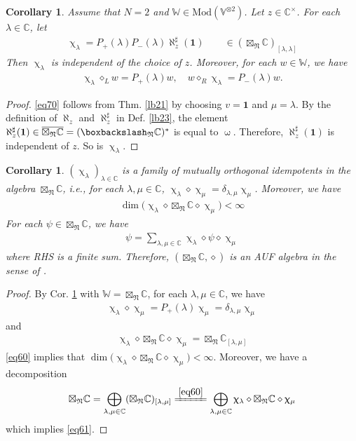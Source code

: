 \documentclass[11pt,b5paper,notitlepage]{article}
\theoremstyle{definition}
\theoremstyle{plain}
\newtheorem{co}[df]{Corollary}
\newcommand{\ovl}{\overline}
\newcommand{\idt}{\mathbf{1}}
\newcommand{\Vbb}{\mathbb V}
\newcommand{\Wbb}{\mathbb W}
\newcommand{\Cbb}{\mathbb C}
\newcommand{\<}{\left\langle}
\renewcommand{\>}{\right\rangle}
\newcommand{\bbs}{\boxbackslash}
\newcommand{\Mod}{\mathrm{Mod}}
\newcommand{\fn}{\mathfrak{N}}
\numberwithin{equation}{section}
\begin{document}
\begin{co}\label{lb20}
Assume that $N=2$ and $\Wbb\in\Mod(\Vbb^{\otimes 2})$. Let $z\in\Cbb^\times$. For each $\lambda\in \Cbb$, let 
\begin{align}\label{eq85}
\upchi_\lambda=P_+(\lambda)P_-(\lambda)\aleph_z^\sharp (\idt)\qquad\in (\boxtimes_\fn\Cbb)_{[\lambda,\lambda]}
\end{align}
Then $\upchi_\lambda$ is independent of the choice of $z$. Moreover, for each $w\in \Wbb$, we have 
\begin{align}\label{eq70}
	\upchi_\lambda\diamond_{L} w=P_+(\lambda)w,\quad w\diamond_R \upchi_\lambda=P_-(\lambda)w.
\end{align}
\end{co}
\begin{proof}
\eqref{eq70} follows from Thm. \ref{lb21} by choosing $v=\idt$ and $\mu=\lambda$. By the definition of $\aleph_z$ and $\aleph_z^\sharp$ in Def. \ref{lb23}, the element $\aleph_z^\sharp(\idt)\in\ovl{\boxtimes_\fn\Cbb}=(\bbs_\fn\Cbb)^*$ is equal to $\upomega$. Therefore, $\aleph_z^\sharp(\idt)$ is independent of $z$. So is $\upchi_\lambda$. 
\end{proof}

\begin{co}\label{lb54}
$(\upchi_\lambda)_{\lambda\in \Cbb}$ is a family of mutually orthogonal idempotents in the algebra $\boxtimes_\fn\Cbb$, i.e., for each $\lambda,\mu\in \Cbb$, $\upchi_\lambda\diamond \upchi_\mu=\delta_{\lambda,\mu}\upchi_\mu$. Moreover, we have
\begin{gather*}
\dim \big(\upchi_\lambda \diamond \boxtimes_\fn\Cbb \diamond \upchi_\mu\big)<\infty
\end{gather*}
For each $\psi\in \boxtimes_\fn\Cbb$, we have
\begin{align}\label{eq61}
\psi=\sum_{\lambda,\mu\in \Cbb} \upchi_\lambda \diamond \psi\diamond \upchi_\mu
\end{align}
where RHS is a finite sum. Therefore, $(\boxtimes_\fn\Cbb,\diamond)$ is an AUF algebra in the sense of \cite{GZ4}. 
\end{co}


\begin{proof}
	By Cor. \ref{lb20} with $\Wbb=\boxtimes_\fn\Cbb$, for each $\lambda,\mu\in \Cbb$, we have 
	\begin{align*}
		\upchi_\lambda\diamond \upchi_\mu=P_+(\lambda)\upchi_\mu=\delta_{\lambda,\mu}\upchi_\mu
	\end{align*}
	and 
	\begin{align}\label{eq60}
		\upchi_\lambda\diamond \boxtimes_\fn\Cbb\diamond \upchi_\mu=\boxtimes_\fn\Cbb_{[\lambda,\mu]}
	\end{align}
	\eqref{eq60} implies that $\dim \big(\upchi_\lambda \diamond \boxtimes_\fn\Cbb \diamond \upchi_\mu\big)<\infty$. Moreover, we have a decomposition
	\begin{align*}
		\boxtimes_\fn\Cbb=\bigoplus_{\lambda,\mu\in \Cbb} (\boxtimes_\fn\Cbb)_{[\lambda,\mu]}\xlongequal{\eqref{eq60}}\bigoplus_{\lambda,\mu\in \Cbb} \upchi_\lambda\diamond \boxtimes_\fn\Cbb\diamond \upchi_\mu
	\end{align*}
	which implies \eqref{eq61}. 
\end{proof}
\end{document}
